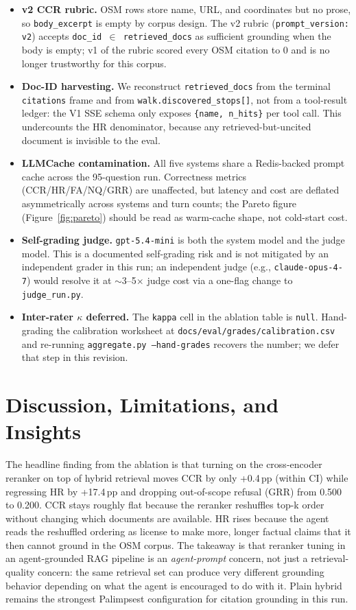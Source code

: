 \documentclass[sigconf,nonacm]{acmart}
\begin{document}
\begin{itemize}[leftmargin=*,itemsep=2pt,topsep=2pt]
  \item \textbf{v2 CCR rubric.} OSM rows store name, URL, and coordinates but no prose, so \texttt{body\_excerpt} is empty by corpus design. The v2 rubric (\texttt{prompt\_version: v2}) accepts \texttt{doc\_id $\in$ retrieved\_docs} as sufficient grounding when the body is empty; v1 of the rubric scored every OSM citation to 0 and is no longer trustworthy for this corpus.
  \item \textbf{Doc-ID harvesting.} We reconstruct \texttt{retrieved\_docs} from the terminal \texttt{citations} frame and from \texttt{walk.\allowbreak discovered\_stops[]}, not from a tool-result ledger: the V1 SSE schema only exposes \texttt{\{name, n\_hits\}} per tool call. This undercounts the HR denominator, because any retrieved-but-uncited document is invisible to the eval.
  \item \textbf{LLMCache contamination.} All five systems share a Redis-backed prompt cache across the 95-question run. Correctness metrics (CCR/HR/FA/NQ/GRR) are unaffected, but latency and cost are deflated asymmetrically across systems and turn counts; the Pareto figure (Figure~\ref{fig:pareto}) should be read as warm-cache shape, not cold-start cost.
  \item \textbf{Self-grading judge.} \texttt{gpt-5.4-mini} is both the system model and the judge model. This is a documented self-grading risk and is not mitigated by an independent grader in this run; an independent judge (e.g., \texttt{claude-opus-4-7}) would resolve it at $\sim$3--5$\times$ judge cost via a one-flag change to \texttt{judge\_run.py}.
  \item \textbf{Inter-rater $\kappa$ deferred.} The \texttt{kappa} cell in the ablation table is \texttt{null}. Hand-grading the calibration worksheet at \texttt{docs/\allowbreak eval/\allowbreak grades/\allowbreak calibration.csv} and re-running \texttt{aggregate.py --hand-grades} recovers the number; we defer that step in this revision.
\end{itemize}

\section{Discussion, Limitations, and Insights}
The headline finding from the ablation is that turning on the cross-encoder reranker on top of hybrid retrieval moves CCR by only +0.4\,pp (within CI) while regressing HR by +17.4\,pp and dropping out-of-scope refusal (GRR) from 0.500 to 0.200. CCR stays roughly flat because the reranker reshuffles top-k order without changing which documents are available. HR rises because the agent reads the reshuffled ordering as license to make more, longer factual claims that it then cannot ground in the OSM corpus. The takeaway is that reranker tuning in an agent-grounded RAG pipeline is an \emph{agent-prompt} concern, not just a retrieval-quality concern: the same retrieval set can produce very different grounding behavior depending on what the agent is encouraged to do with it. Plain hybrid remains the strongest Palimpsest configuration for citation grounding in this run.
\end{document}
